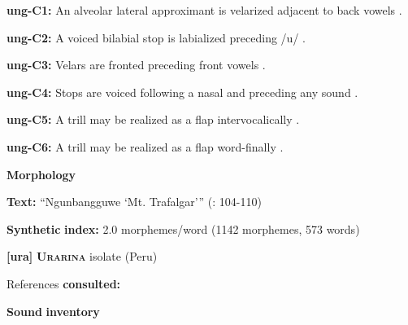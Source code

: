 \begin{styleBody}
\textbf{ung-C1:} An alveolar lateral approximant is velarized adjacent to back vowels \citep[11]{Rumsey1978}.
\end{styleBody}

\begin{styleBody}
\textbf{ung-C2:} A voiced bilabial stop is labialized preceding /u/ \citep[9-10]{Rumsey1978}.
\end{styleBody}

\begin{styleBody}
\textbf{ung-C3:} Velars are fronted preceding front vowels \citep[11]{Rumsey1978}.
\end{styleBody}

\begin{styleBody}
\textbf{ung-C4:} Stops are voiced following a nasal and preceding any sound \citep[9]{Rumsey1978}.
\end{styleBody}

\begin{styleBody}
\textbf{ung-C5:} A trill may be realized as a flap intervocalically \citep[12]{Rumsey1978}.
\end{styleBody}

\begin{styleBody}
\textbf{ung-C6:} A trill may be realized as a flap word-finally \citep[12]{Rumsey1978}.
\end{styleBody}

\begin{styleBody}
\textbf{Morphology}
\end{styleBody}

\begin{styleBody}
\textbf{Text:} “Ngunbangguwe ‘Mt. Trafalgar’” (\citealt{CoateOates1970}: 104-110)
\end{styleBody}

\begin{styleBody}
\textbf{Synthetic} \textbf{index:} 2.0 morphemes/word (1142 morphemes, 573 words)
\end{styleBody}

\begin{styleBody}
\textbf{[ura]}   \textbf{\textsc{Urarina}}  isolate (Peru)
\end{styleBody}

\begin{styleBody}
References \textbf{consulted:} \citet{Olawsky2006}
\end{styleBody}

\begin{styleBody}
\textbf{Sound} \textbf{inventory}
\end{styleBody}

